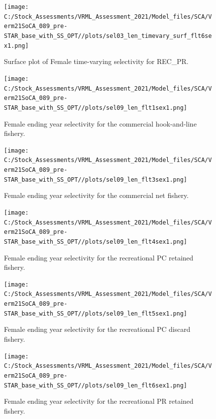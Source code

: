 \documentclass[
  english,
  a4paper,
]{article}
\begin{document}
\begin{figure}
\centering
\texttt{[image: C:/Stock\_Assessments/VRML\_Assessment\_2021/Model\_files/SCA/Verm21SoCA\_089\_pre-STAR\_base\_with\_SS\_OPT//plots/sel03\_len\_timevary\_surf\_flt6sex1.png]}
\caption{Surface plot of Female time-varying selectivity for REC\_PR.\label{fig:sel03_len_timevary_surf_flt6sex1}}
\end{figure}

\FloatBarrier

\FloatBarrier

\begin{figure}
\centering
\texttt{[image: C:/Stock\_Assessments/VRML\_Assessment\_2021/Model\_files/SCA/Verm21SoCA\_089\_pre-STAR\_base\_with\_SS\_OPT//plots/sel09\_len\_flt1sex1.png]}
\caption{Female ending year selectivity for the commercial hook-and-line fishery.\label{fig:endyr-selex-COM-HKL}}
\end{figure}

\begin{figure}
\centering
\texttt{[image: C:/Stock\_Assessments/VRML\_Assessment\_2021/Model\_files/SCA/Verm21SoCA\_089\_pre-STAR\_base\_with\_SS\_OPT//plots/sel09\_len\_flt3sex1.png]}
\caption{Female ending year selectivity for the commercial net fishery.\label{fig:endyr-selex-COM-NET}}
\end{figure}

\begin{figure}
\centering
\texttt{[image: C:/Stock\_Assessments/VRML\_Assessment\_2021/Model\_files/SCA/Verm21SoCA\_089\_pre-STAR\_base\_with\_SS\_OPT//plots/sel09\_len\_flt4sex1.png]}
\caption{Female ending year selectivity for the recreational PC retained fishery.\label{fig:endyr-selex-REC-PC}}
\end{figure}

\begin{figure}
\centering
\texttt{[image: C:/Stock\_Assessments/VRML\_Assessment\_2021/Model\_files/SCA/Verm21SoCA\_089\_pre-STAR\_base\_with\_SS\_OPT//plots/sel09\_len\_flt5sex1.png]}
\caption{Female ending year selectivity for the recreational PC discard fishery.\label{fig:endyr-selex-REC-PC-DIS}}
\end{figure}

\begin{figure}
\centering
\texttt{[image: C:/Stock\_Assessments/VRML\_Assessment\_2021/Model\_files/SCA/Verm21SoCA\_089\_pre-STAR\_base\_with\_SS\_OPT//plots/sel09\_len\_flt6sex1.png]}
\caption{Female ending year selectivity for the recreational PR retained fishery.\label{fig:endyr-selex-REC-PR}}
\end{figure}
\end{document}
